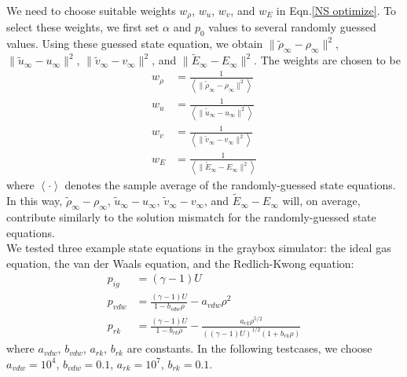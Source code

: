 \documentclass{paper1}
\begin{document}
We need to choose suitable weights $w_\rho$, $w_u$, $w_v$, and $w_E$ in
Eqn.\eqref{NS optimize}. To select these weights, 
we first set $\alpha$ and $p_0$ values to several randomly guessed values. 
Using these guessed state equation, we 
obtain $\|\tilde{\rho}_{\infty} - \rho_{\infty}\|^2$,
$\|\tilde{u}_{\infty}- u_{\infty}\|^2 $,
$ \|\tilde{v}_{\infty}- v_{\infty}\|^2$,
and $\|\tilde{E}_{\infty} - E_\infty\|^2$.
The weights are chosen to be
\begin{equation}\begin{split}
    w_\rho &= \frac{1}{\left<\|\tilde{\rho}_{\infty} - \rho_{\infty}\|^2\right>}\\
    w_u &= \frac{1}{\left<\|\tilde{u}_{\infty} - 
    {u}_{\infty}\|^2\right>}\\
    w_v &= \frac{1}{\left<\|\tilde{v}_{\infty} - 
    v_{\infty}\|^2\right>}\\
    w_E &= \frac{1}{\left<\|\tilde{E}_{\infty} - 
    E_{\infty}\|^2\right>}
\end{split}
\label{NS weights}
\end{equation}
where $\left<\cdot\right>$ denotes the sample average of the randomly-guessed state equations.
In this way, $\tilde{\rho}_\infty-\rho_\infty$, 
$\tilde{u}_{\infty}-u_\infty$, $\tilde{v}_{\infty}-v_\infty$,
and $\tilde{E}_\infty-E_\infty$ will, on average, contribute
similarly to the solution mismatch for the randomly-guessed state equations.\\

We tested three example state equations in the graybox simulator:
the ideal gas equation, the van der Waals equation, and the Redlich-Kwong equation:
\begin{equation}\begin{split}
    p_{ig} &= (\gamma-1) U\\
    p_{vdw} &= \frac{(\gamma-1)U}{1-b_{vdw}\rho} - a_{vdw}\rho^2\\
    p_{rk} &= \frac{(\gamma-1)U}{1-b_{rk}\rho} - 
    \frac{a_{rk}\rho^{5/2}}{((\gamma-1)U)^{1/2}(1+b_{rk}\rho)}
\end{split}\label{NS state equations}
\end{equation}
where $a_{vdw}$, $b_{vdw}$, $a_{rk}$, $b_{rk}$ are constants. In the following testcases, we choose
$a_{vdw}=10^4$, $b_{vdw}=0.1$, $a_{rk}=10^7$, $b_{rk}=0.1$.\\
\end{document}
